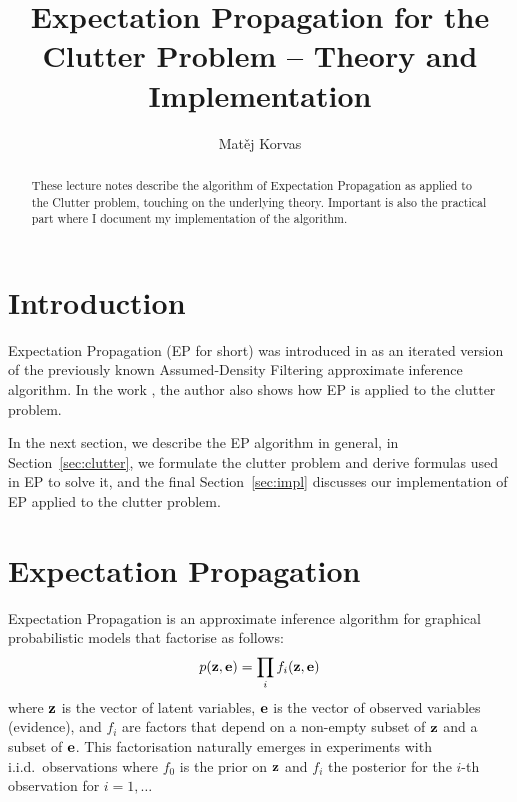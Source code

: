 \documentclass[11pt]{article}
\title{Expectation Propagation for the Clutter Problem -- Theory and 
Implementation}
\author{Matěj Korvas \\
}
\begin{document}
\maketitle
\begin{abstract}
These lecture notes describe the algorithm of Expectation Propagation as 
applied to the Clutter problem, touching on the underlying theory.  
Important is also the practical part where I document my implementation of 
the algorithm.
\end{abstract}

\section{Introduction}

Expectation Propagation (EP for short) was introduced in 
\cite{minka_expectation_2001} as an iterated version of the previously 
known Assumed-Density Filtering approximate inference algorithm. In the 
work \cite{minka_expectation_2001}, the author also shows how EP is applied 
to the clutter problem.

In the next section, we describe the EP algorithm in general, in 
Section~\ref{sec:clutter}, we formulate the clutter problem and derive 
formulas used in EP to solve it, and the final Section~\ref{sec:impl} 
discusses our implementation of EP applied to the clutter problem.

\section{Expectation Propagation}

Expectation Propagation is an approximate inference algorithm for graphical 
probabilistic models that factorise as follows:
\begin{equation}
	p(\mathbf{z}, \mathbf{e}) = \prod_{i}{f_i(\mathbf{z}, \mathbf{e})}
	\label{eq:factorisation}
\end{equation}
where $\mathbf{z}$ is the vector of latent variables, $\mathbf{e}$ is the vector 
of observed variables (evidence), and $f_i$ are factors that depend on 
a non-empty subset of $\mathbf{z}$ and a subset of $\mathbf{e}$. This 
factorisation naturally emerges in experiments with i.i.d.\ observations 
where $f_0$ is the prior on $\mathbf{z}$ and $f_i$ the posterior for the 
$i$-th observation for $i = 1, \dots$

\end{document}
